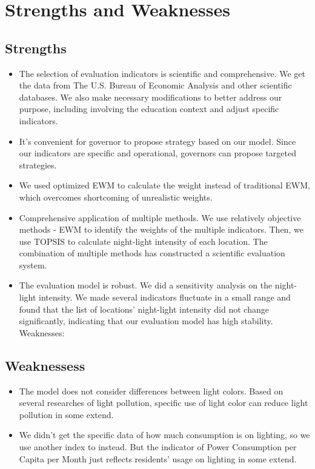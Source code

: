 \MinParskip{}

\section{Strengths and Weaknesses}
\subsection{Strengths}

\begin{itemize}
    \item The selection of evaluation indicators is scientific and comprehensive. We get the data from The U.S. Bureau of Economic Analysis and other scientific databases. We also make necessary modifications to better address our purpose, including involving the education context and adjust specific indicators.
    
    \item It's convenient for governor to propose strategy based on our model. Since our indicators are specific and operational, governors can propose targeted strategies. 
    
    \item We used optimized EWM to calculate the weight instead of traditional EWM, which overcomes shortcoming of unrealistic weights.

    \item Comprehensive application of multiple methods. We use relatively objective methods - EWM to identify the weights of the multiple indicators. Then, we use TOPSIS to calculate night-light intensity of each location. The combination of multiple methods has constructed a scientific evaluation system.
    
    \item The evaluation model is robust. We did a sensitivity analysis on the night-light intensity. We made several indicators fluctuate in a small range and found that the list of locations' night-light intensity did not change significantly, indicating that our evaluation model has high stability.
    Weaknesses:
\end{itemize}


\subsection{Weaknessess}
\begin{itemize}
    \item The model does not consider differences between light colors. Based on several researches of light pollution, specific use of light color can reduce light pollution in some extend.
    
    \item We didn't get the specific data of how much consumption is on lighting, so we use another index to instead. But the indicator of Power Consumption per Capita per Month just reflects residents' usage on lighting in some extend.
\end{itemize}